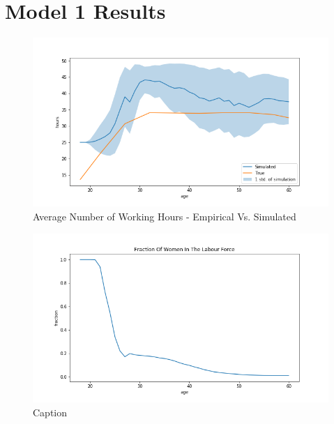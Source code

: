 \section{Model 1 Results}

\begin{figure}
    \centering
    \includegraphics[scale=0.6]{figures/dqi_model1_estimation_labour_supply.png}
    \caption{Average Number of Working Hours - Empirical Vs. Simulated}
    \label{fig:dqi_model1_average_path_sim_vs_empirical}
\end{figure}

\begin{figure}
    \centering
    \includegraphics[scale=0.6]{figures/dqi_model1_women_in_labour_force_fraction.png}
    \caption{Caption}
    \label{fig:dqi_model1_birth_onset}
\end{figure}

